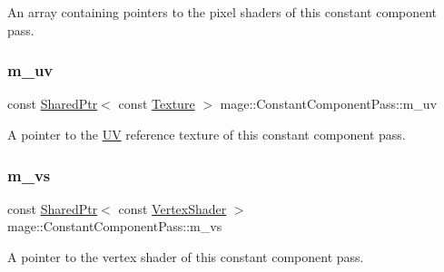 An array containing pointers to the pixel shaders of this constant component pass. \hypertarget{classmage_1_1_constant_component_pass_ad69f0d02de95b9125651b447cd8fd884}{}\label{classmage_1_1_constant_component_pass_ad69f0d02de95b9125651b447cd8fd884} 
\subsubsection{\texorpdfstring{m\+\_\+uv}{m\_uv}}
{\footnotesize\ttfamily const \hyperlink{namespacemage_a1e01ae66713838a7a67d30e44c67703e}{Shared\+Ptr}$<$ const \hyperlink{classmage_1_1_texture}{Texture} $>$ mage\+::\+Constant\+Component\+Pass\+::m\+\_\+uv\hspace{0.3cm}{\ttfamily [private]}}

A pointer to the \hyperlink{structmage_1_1_u_v}{UV} reference texture of this constant component pass. \hypertarget{classmage_1_1_constant_component_pass_aec78ab8193d28847ad591947f03f6515}{}\label{classmage_1_1_constant_component_pass_aec78ab8193d28847ad591947f03f6515} 
\subsubsection{\texorpdfstring{m\+\_\+vs}{m\_vs}}
{\footnotesize\ttfamily const \hyperlink{namespacemage_a1e01ae66713838a7a67d30e44c67703e}{Shared\+Ptr}$<$ const \hyperlink{classmage_1_1_vertex_shader}{Vertex\+Shader} $>$ mage\+::\+Constant\+Component\+Pass\+::m\+\_\+vs\hspace{0.3cm}{\ttfamily [private]}}

A pointer to the vertex shader of this constant component pass. 